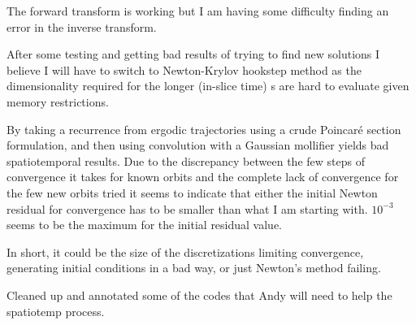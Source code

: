 \begin{description}
{\begin{description}
The forward transform is working but I am having some difficulty finding
an error in the inverse transform.

\item[hoping for new invariant solutions]
After some testing and getting bad results of trying to find new solutions
I believe I will have to switch to Newton-Krylov hookstep method as the
dimensionality required for the longer (in-slice time) {\rpo}s are hard
to evaluate given memory restrictions.

By taking a recurrence from ergodic trajectories using a crude Poincar\'e section
formulation, and then using convolution with a Gaussian mollifier yields bad
spatiotemporal results. Due to the discrepancy between the few steps of convergence
it takes for known orbits and the complete lack of convergence for the few new orbits
tried it seems to indicate that either the initial Newton residual for convergence has
to be smaller than what I am starting with. $10^{-3}$ seems to be the maximum
for the initial residual value.

In short, it could be the size of the discretizations limiting convergence, generating
initial conditions in a bad way, or just Newton's method failing.


\item[clean up and commentation]
Cleaned up and annotated some of the codes that Andy will need to help
the spatiotemp process.

\end{description}
}

\end{description}
